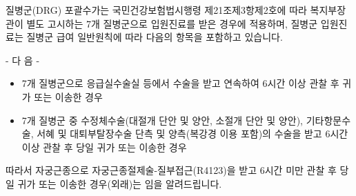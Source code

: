 \begin{commentbox}{}
질병군(DRG) 포괄수가는 국민건강보험법시행령 제21조제3항제2호에 따라 복지부장관이 별도 고시하는 7개 질병군으로 입원진료를 받은 경우에 적용하며, 질병군 입원진료는 질병군 급여 일반원칙에 따라 다음의 항목을 포함하고 있습니다.\par
- 다 음 -
\begin{itemize}\tightlist
\item 7개 질병군으로 응급실\bullet 수술실 등에서 수술을 받고 연속하여 6시간 이상 관찰 후 귀가 또는 이송한 경우 
\item 7개 질병군 중 수정체수술(대절개 단안 및 양안, 소절개 단안 및 양안), 기타항문수술, 서혜 및 대퇴부탈장수술 단측 및 양측(복강경 이용 포함)의 수술을 받고 6시간 이상 관찰 후 당일 귀가 또는 이송한 경우
\end{itemize}
따라서 자궁근종으로 자궁근종절제술-질부접근(R4123)을 받고 6시간 미만 관찰 후 당일 귀가 또는 이송한 경우(외래)는 임을 알려드립니다.
\end{commentbox}
